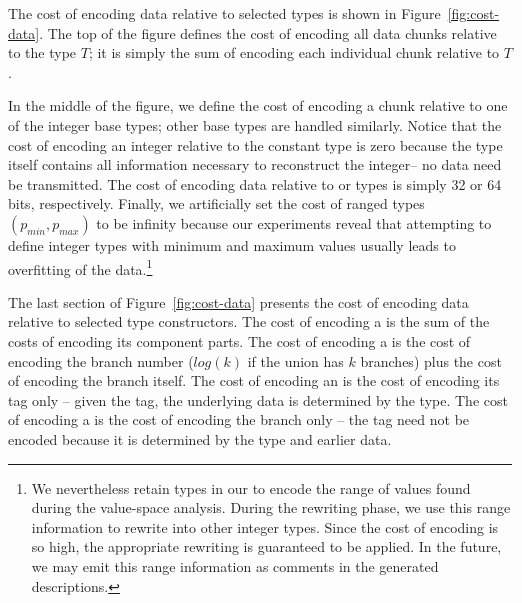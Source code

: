 The cost of encoding data relative to selected types is shown in 
Figure~\ref{fig:cost-data}.  The top of the figure defines
the cost of encoding all data chunks relative to the type $T$; it is
simply the sum of encoding each individual chunk relative to $T$.  

In the middle of the figure,
we define the cost of encoding a chunk relative to one of the integer base 
types; other base types are handled similarly.  Notice that the cost of 
encoding an integer relative to the constant type  is
zero because the type itself contains all information
necessary to reconstruct the integer-- no data need be transmitted.
The cost of encoding data relative to  or  types 
is simply 32 or 64 bits, respectively.  Finally, we artificially set the cost of
ranged types $(p_{min},p_{max})$ to be infinity because
our experiments reveal that attempting to define integer types with
minimum and maximum values usually leads to overfitting of the data.\footnote{
We nevertheless retain  types in our \ir{} to encode
the range of values found during the value-space analysis.  During the
rewriting phase, we use this range information to rewrite 
into other integer types.  Since the
cost of encoding  is so high, the appropriate rewriting 
is guaranteed to be applied.  In the future, we may emit this range information
as comments in the generated descriptions.}

The last section of Figure~\ref{fig:cost-data} presents the cost of
encoding data relative to selected type constructors.  
The cost of encoding a  is the sum of the costs of encoding
its component parts.  The cost of encoding a  is the cost
of encoding the branch number ($log(k)$ if the union has $k$ branches)
plus the cost of encoding the branch itself.  The cost of encoding
an  is the cost of encoding its tag only -- given the tag,
the underlying data is determined by the type.  The cost of encoding
a  is the cost of encoding the branch only -- the tag need not
be encoded because it is determined by the type and earlier data.

